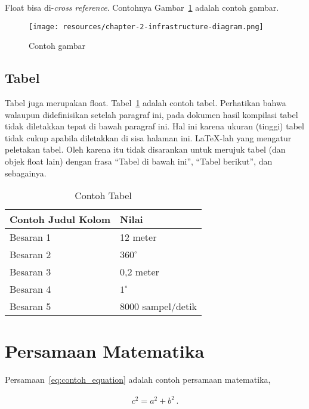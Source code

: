 Float bisa di-\textit{cross reference}. Contohnya Gambar~\ref{fig:contoh_gambar} adalah contoh gambar.

\begin{figure}[h]
    \centering
    \texttt{[image: resources/chapter-2-infrastructure-diagram.png]}
    \caption{Contoh gambar}
    \label{fig:contoh_gambar}
\end{figure}

\subsection{Tabel}

Tabel juga merupakan float. Tabel~\ref{table:contoh_tabel} adalah contoh tabel. Perhatikan bahwa walaupun didefinisikan setelah paragraf ini, pada dokumen hasil kompilasi tabel tidak diletakkan tepat di bawah paragraf ini. Hal ini karena ukuran (tinggi) tabel tidak cukup apabila diletakkan di sisa halaman ini. \LaTeX-lah yang mengatur peletakan tabel. Oleh karena itu tidak disarankan untuk merujuk tabel (dan objek float lain) dengan frasa ``Tabel di bawah ini'', ``Tabel berikut'', dan sebagainya.

\begin{table}[htbp]
    \centering
    \caption{Contoh Tabel}
    \label{table:contoh_tabel}
    \begin{tabular}{ll}
        \toprule
        \multicolumn{1}{l}{\textbf{Contoh Judul Kolom}} & \multicolumn{1}{l}{\textbf{Nilai}}\\
        \midrule
        Besaran 1 & 12 meter          \\
        Besaran 2 & $360^\circ$       \\
        Besaran 3 & 0,2 meter         \\
        Besaran 4 & $1^\circ$         \\
        Besaran 5 & 8000 sampel/detik \\
        \bottomrule
    \end{tabular}
\end{table}

\section{Persamaan Matematika}

Persamaan~\eqref{eq:contoh_equation} adalah contoh persamaan matematika,

\begin{align}
    c^2 = a^2 + b^2\,.
\label{eq:contoh_equation}
\end{align}

